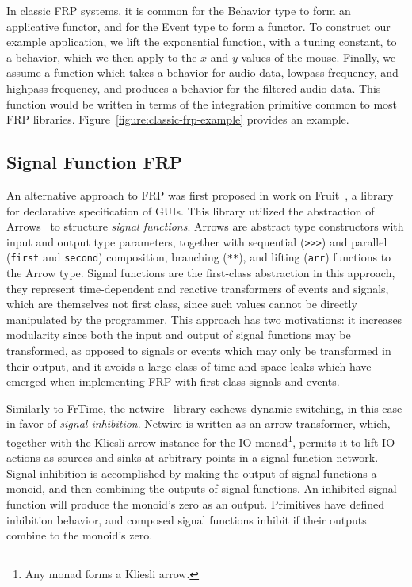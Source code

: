 In classic FRP systems, it is common for the Behavior type to form an applicative functor, and for the Event type to form a functor. To construct our example application,
we lift the exponential function, with a tuning constant, to a behavior, which we then apply to the $x$ and $y$ values of the mouse. Finally, we assume
a function which takes a behavior for audio data, lowpass frequency, and highpass frequency, and produces a behavior for the filtered audio data. This
function would be written in terms of the integration primitive common to most FRP libraries. Figure~\ref{figure:classic-frp-example} provides an example.

\subsection{Signal Function FRP}
\label{subsection:signal_function_frp}

An alternative approach to FRP was first proposed in work on Fruit~\cite{Courtney2001-1}, a library for declarative specification of GUIs. This library
utilized the abstraction of Arrows~\cite{Hughes2000} to structure {\em signal functions}. Arrows are abstract type constructors with input and output type
parameters, together with sequential ({\tt >>>}) and parallel ({\tt first} and {\tt second}) composition, branching ({\tt ***}), and lifting ({\tt arr}) functions
to the Arrow type. Signal functions are the first-class abstraction in this approach, they represent time-dependent and reactive transformers of events and signals, 
which are themselves not first class, since such values cannot be directly manipulated by the programmer.
This approach has two motivations: it increases modularity since both the input and output of signal functions may be transformed,
as opposed to signals or events which may only be transformed in their output, and it avoids a large class of time and space leaks which have emerged when
implementing FRP with first-class signals and events.

Similarly to FrTime, the netwire~\cite{Soylemez} library eschews dynamic switching, in this case in favor of {\em signal inhibition}. Netwire is written as an arrow
transformer, which, together with the Kliesli arrow instance for the IO monad\footnote{Any monad forms a Kliesli arrow.}, permits it to lift IO actions as sources and
sinks at arbitrary points in a signal function network. Signal inhibition is accomplished by making the output of signal functions a monoid, and then combining the
outputs of signal functions. An inhibited signal function will produce the monoid's zero as an output. Primitives have defined inhibition behavior, and composed signal
functions inhibit if their outputs combine to the monoid's zero.

